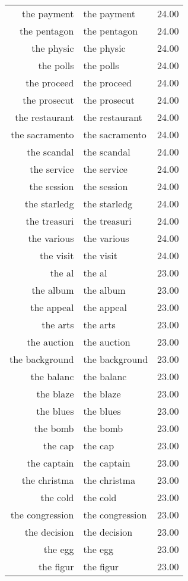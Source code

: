\begin{table}[ht]
\begin{tabular}{rlr}
  the payment & the payment & 24.00 \\ 
  the pentagon & the pentagon & 24.00 \\ 
  the physic & the physic & 24.00 \\ 
  the polls & the polls & 24.00 \\ 
  the proceed & the proceed & 24.00 \\ 
  the prosecut & the prosecut & 24.00 \\ 
  the restaurant & the restaurant & 24.00 \\ 
  the sacramento & the sacramento & 24.00 \\ 
  the scandal & the scandal & 24.00 \\ 
  the service & the service & 24.00 \\ 
  the session & the session & 24.00 \\ 
  the starledg & the starledg & 24.00 \\ 
  the treasuri & the treasuri & 24.00 \\ 
  the various & the various & 24.00 \\ 
  the visit & the visit & 24.00 \\ 
  the al & the al & 23.00 \\ 
  the album & the album & 23.00 \\ 
  the appeal & the appeal & 23.00 \\ 
  the arts & the arts & 23.00 \\ 
  the auction & the auction & 23.00 \\ 
  the background & the background & 23.00 \\ 
  the balanc & the balanc & 23.00 \\ 
  the blaze & the blaze & 23.00 \\ 
  the blues & the blues & 23.00 \\ 
  the bomb & the bomb & 23.00 \\ 
  the cap & the cap & 23.00 \\ 
  the captain & the captain & 23.00 \\ 
  the christma & the christma & 23.00 \\ 
  the cold & the cold & 23.00 \\ 
  the congression & the congression & 23.00 \\ 
  the decision & the decision & 23.00 \\ 
  the egg & the egg & 23.00 \\ 
  the figur & the figur & 23.00 \\ 

\end{tabular}
\end{table}
